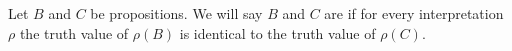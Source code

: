\begin{node}[Definition]\label{prop-0006}%
Let $B$ and $C$ be propositions. We will say $B$ and $C$ are
 if for every interpretation $\rho$ the
truth value of $\rho(B)$ is identical to the truth value of $\rho(C)$.
\end{node}

